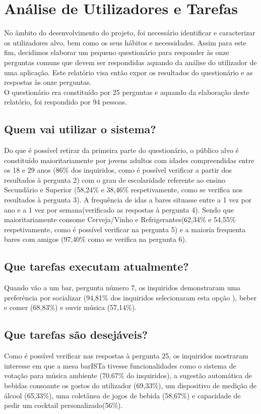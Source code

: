 \documentclass{article}
\begin{document}
\section*{Análise de Utilizadores e Tarefas}

No âmbito do desenvolvimento do projeto, foi necessário identificar e caracterizar os utilizadores alvo, bem como os seus hábitos e necessidades. Assim para este fim, decidimos elaborar um pequeno questionário para responder às onze perguntas comuns que devem ser respondidas aquando da análise do utilizador de uma aplicação. Este relatório visa então expor os resultados do questionário e as respostas às onze perguntas.\\
O questionário era constituído por 25 perguntas e aquando da elaboração deste relatório, foi respondido por 94 pessoas.

\subsection*{Quem vai utilizar o sistema?}
Do que é possível retirar da primeira parte do questionário, o público alvo é constituído maioritariamente por jovens adultos com idades compreendidas entre os 18 e 29 anos (86\% dos inquiridos, como é possível verificar a partir dos resultados à pergunta 2) com o grau de escolaridade referente ao ensino Secundário e Superior (58,24\% e 38,46\% respetivamente, como se verifica nos resultados à pergunta 3). A frequência de idas a bares situasse entre a 1 vez por ano e a 1 vez por semana(verificado as respostas à pergunta 4). Sendo que maioritariamente consome Cerveja/Vinho e Refrigerantes(62,34\% e 54,55\% respetivamente, como é possível verificar na pergunta 5) e a maioria frequenta bares com amigos (97,40\% como se verifica na pergunta 6).
\subsection*{Que tarefas executam atualmente?}
Quando vão a um bar, pergunta número 7, os inquiridos demonstraram uma preferência por socializar (94,81\% dos inquiridos selecionaram esta opção ), beber e comer (68,83\%) e ouvir música (57,14\%).
\subsection*{Que tarefas são desejáveis?}
Como é possível verificar nas respostas à pergunta 25, os inquiridos mostraram interesse em que a mesa barISTa tivesse funcionalidades como o sistema de votação para música ambiente (70.67\% do inquiridos), a sugestão automática de bebidas consoante os gostos do utilizador (69,33\%), um dispositivo de medição de álcool (65,33\%), uma coletânea de jogos de bebida (58,67\%) e capacidade de pedir um cocktail personalizado(56\%).
\end{document}
